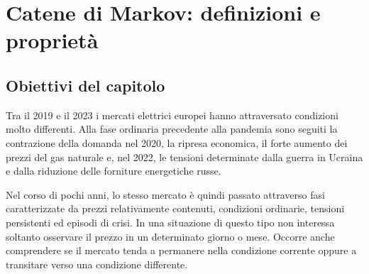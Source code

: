 



\chapter{Catene di Markov: definizioni e propriet\`{a}}

\label{cap:catene-markov}

\section{Obiettivi del capitolo}

Tra il 2019 e il 2023 i mercati elettrici europei hanno attraversato
condizioni molto differenti. Alla fase ordinaria precedente alla
pandemia sono seguiti la contrazione della domanda nel 2020, la ripresa
economica, il forte aumento dei prezzi del gas naturale e, nel 2022, le
tensioni determinate dalla guerra in Ucraina e dalla riduzione delle
forniture energetiche russe.

Nel corso di pochi anni, lo stesso mercato \`{e} quindi passato
attraverso fasi caratterizzate da prezzi relativamente contenuti,
condizioni ordinarie, tensioni persistenti ed episodi di crisi. In una
situazione di questo tipo non interessa soltanto osservare il prezzo in
un determinato giorno o mese. Occorre anche comprendere se il mercato
tenda a permanere nella condizione corrente oppure a transitare verso
una condizione differente.

